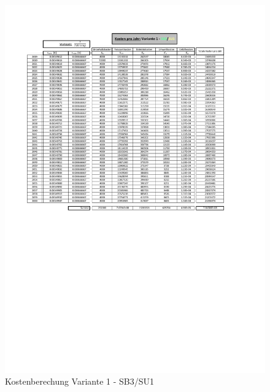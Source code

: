 \begin{figure}[h!]
	\centering
	\includegraphics[width=\textwidth]{figures/Anhang/f-00-A-V1-B3-U1}
	\caption{Kostenberechung Variante 1 - SB3/SU1}
\end{figure}

